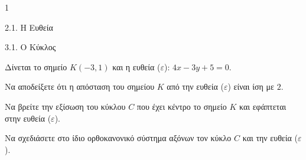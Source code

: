 \begin{ylh}{1}
    \item 2.1. Η Ευθεία
    \item 3.1. Ο Κύκλος
\end{ylh}
Δίνεται το σημείο $K(-3,1)$ και η ευθεία ($\varepsilon$): $4x-3y+5=0$.
\begin{alist}
    \item Να αποδείξετε ότι η απόσταση του σημείου $K$ από την ευθεία ($\varepsilon$) είναι ίση με $2$. 
    \item Να βρείτε την εξίσωση του κύκλου $C$ που έχει κέντρο το σημείο $K$ και εφάπτεται στην ευθεία ($\varepsilon$). 
    \item Να σχεδιάσετε στο ίδιο ορθοκανονικό σύστημα αξόνων τον κύκλο $C$ και την ευθεία ($\varepsilon$). 
\end{alist}